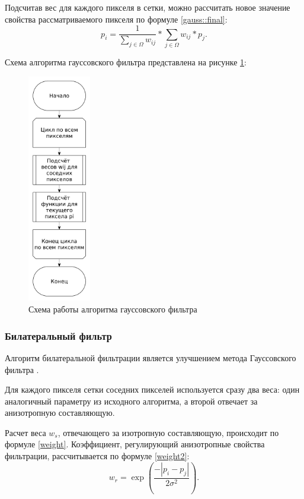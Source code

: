 Подсчитав вес для каждого пикселя в сетки, можно рассчитать новое значение свойства рассматриваемого пикселя по формуле \ref{gauss::final}:
\begin{equation}
	\label{gauss::final}
	p_i = \frac{1}{\sum_{j \in \Omega}^{} w_{ij}} * \sum_{j \in \Omega}^{} w_{ij} * p_j.
\end{equation}

Схема алгоритма гауссовского фильтра представлена на рисунке \ref{fig::gauss}:
\FloatBarrier
\begin{figure}[h]	
	\begin{center}
		\includegraphics[height=10cm]{inc/pdf/gauss.pdf}
	\end{center}
	\captionsetup{justification=centering}
	\caption{Схема работы алгоритма гауссовского фильтра}
	\label{fig::gauss}
\end{figure}
\FloatBarrier

\subsubsection{Билатеральный фильтр}
Алгоритм билатеральной фильтрации является улучшением метода Гауссовского фильтра \cite{bilateral}.

Для каждого пикселя сетки соседних пикселей используется сразу два веса: один аналогичный параметру из исходного алгоритма, а второй отвечает за анизотропную составляющую. 

Расчет веса $w_s$, отвечающего за изотропную составляющую, происходит по формуле \ref{weight}. 
Коэффициент, регулирующий анизотропные свойства фильтрации, рассчитывается по формуле \ref{weight2}:
\begin{equation}
	\label{weight2}
	w_{r} = \exp\left(\frac{-|p_i - p_j|}{2\sigma^2}\right).
\end{equation}

